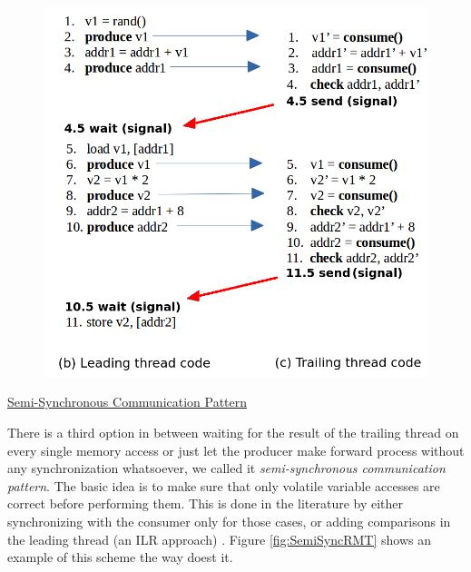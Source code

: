 \begin{figure}[h]
	\centering
	\includegraphics[height=0.5\textheight]{images/CodeTransformation-Cyclic.png}
	\label{fig:CodeTransformationWithRMTCyclic}
\end{figure}

\pagebreak

\begin{flushleft}
\underline{Semi-Synchronous Communication Pattern}
\end{flushleft}

There is a third option in between waiting for the result of the trailing thread on every single memory access or just let the producer make forward process without any synchronization whatsoever, we called it \textit{semi-synchronous communication pattern}. The basic idea is to make sure that only volatile variable accesses are correct before performing them. This is done in the literature by either synchronizing with the consumer only for those cases, or adding comparisons in the leading thread (an ILR approach) \cite{wang2007compiler} \cite{zhang2012daft}. Figure \ref{fig:SemiSyncRMT} shows an example of this scheme the way \cite{wang2007compiler} doest it. 

